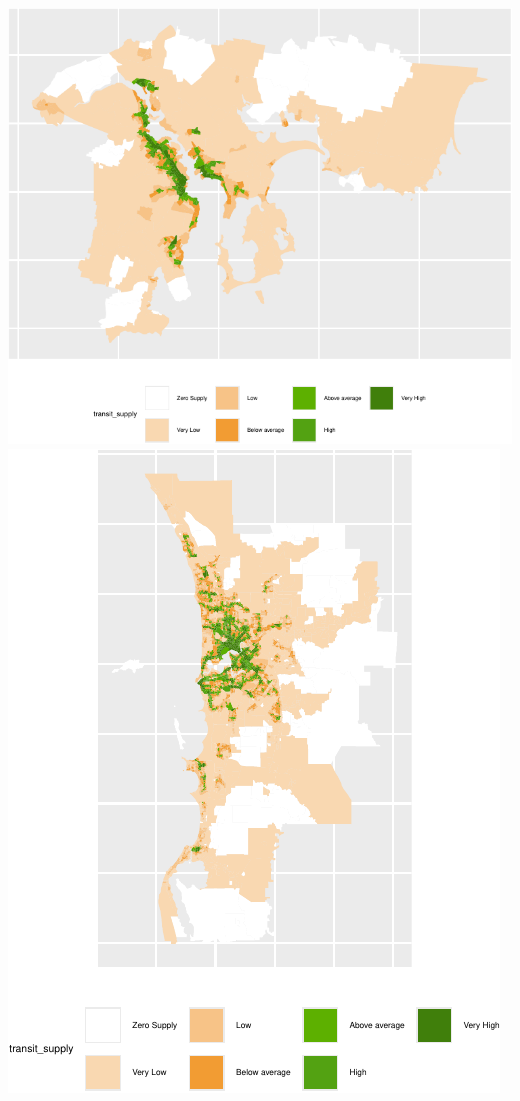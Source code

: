 \documentclass[preprint, 3p,
authoryear]{elsarticle} %
\begin{document}
\includegraphics{Leveraging_GTFS_to_assess_transit_supply_Transport_Geography_files/figure-latex/Australian_cities_2021-4.pdf}
\includegraphics{Leveraging_GTFS_to_assess_transit_supply_Transport_Geography_files/figure-latex/Australian_cities_2021-5.pdf}
\end{document}

